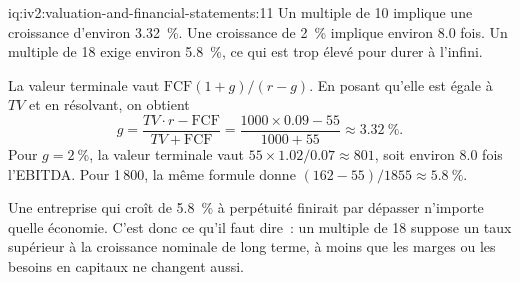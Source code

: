 \begin{solution}{iq:iv2:valuation-and-financial-statements:11}
Un multiple de 10 implique une croissance d'environ 3.32~\%. Une croissance de 2~\% implique environ 8.0 fois. Un multiple de 18 exige environ 5.8~\%, ce qui est trop élevé pour durer à l'infini.

La valeur terminale vaut $\mathrm{FCF}(1 + g)/(r - g)$. En posant qu'elle est égale à $TV$ et en résolvant, on obtient
\[
g = \frac{TV \cdot r - \mathrm{FCF}}{TV + \mathrm{FCF}} = \frac{1000 \times 0.09 - 55}{1000 + 55} \approx 3.32~\%.
\]
Pour $g = 2~\%$, la valeur terminale vaut $55 \times 1.02/0.07 \approx 801$, soit environ 8.0 fois l'EBITDA. Pour 1\,800, la même formule donne $(162 - 55)/1855 \approx 5.8~\%$.

Une entreprise qui croît de 5.8~\% à perpétuité finirait par dépasser n'importe quelle économie. C'est donc ce qu'il faut dire~: un multiple de 18 suppose un taux supérieur à la croissance nominale de long terme, à moins que les marges ou les besoins en capitaux ne changent aussi.

\end{solution}

